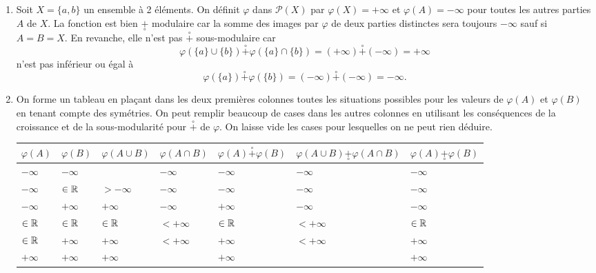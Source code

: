   \begin{demo}
  \begin{enumerate}
    \item Soit $X=\{a,b\}$ un ensemble à 2 éléments. On définit $\varphi$ dans $\mathcal{P}(X)$ par $\varphi(X) = +\infty$ et $\varphi(A) = - \infty$ pour toutes les autres parties $A$ de $X$. La fonction est bien $\underset{\circ}{+}$ modulaire car la somme des images par $\varphi$ de deux parties distinctes sera toujours $-\infty$ sauf si $A=B=X$. En revanche, elle n'est pas $\overset{\circ}{+}$ sous-modulaire car
    \begin{displaymath}
      \varphi(\{a\}\cup \{b\}) \overset{\circ}{+} \varphi(\{a\}\cap \{b\}) = (+\infty) \overset{\circ}{+} (-\infty) = + \infty
    \end{displaymath}
    n'est pas inférieur ou égal à
    \begin{displaymath}
      \varphi(\{a\}) \overset{\circ}{+} \varphi(\{b\}) = (-\infty) \overset{\circ}{+} (-\infty) = - \infty.
    \end{displaymath}

    \item On forme un tableau en plaçant dans les deux premières colonnes toutes les situations possibles pour les valeurs de $\varphi(A)$ et $\varphi(B)$ en tenant compte des symétries. On peut remplir beaucoup de cases dans  les autres colonnes en utilisant les conséquences de la croissance et de la sous-modularité pour $\overset{\circ}{+}$ de $\varphi$. On laisse vide les cases pour lesquelles on ne peut rien déduire.
\begin{center}
\begin{tabular}{lllllll}
$\varphi(A)$ & $\varphi(B)$ & $\varphi(A\cup B)$ & $\varphi(A\cap B)$ & $\varphi(A) \overset{\circ}{+} \varphi(B)$ & $\varphi(A\cup B) \underset{\circ}{+} \varphi(A\cap B)$ & $\varphi(A) \underset{\circ}{+} \varphi(B)$\\ \hline
$-\infty$    & $-\infty$    &                    & $-\infty$          & $-\infty$                              & $-\infty$   & $-\infty$ \\  \hline
$-\infty$    & $\in \mathbb{R}$     & $> -\infty$        & $-\infty$          & $-\infty$                              & $-\infty$   & $-\infty$ \\ \hline
$-\infty$    & $+\infty$    & $+\infty$          & $-\infty$          & $+\infty$                              & $-\infty$   & $-\infty$\\ \hline
$\in \mathbb{R}$     & $\in \mathbb{R}$     & $\in \mathbb{R}$           & $< +\infty$        & $\in \mathbb{R}$                               & $< +\infty$ & $\in \mathbb{R}$\\ \hline
$\in \mathbb{R}$     & $+\infty$    & $+\infty$          & $< +\infty$        & $+\infty$                              & $< +\infty$ & $+\infty$ \\ \hline
$+\infty$    & $+\infty$    & $+\infty$          &                    & $+\infty$                              &             & $+\infty$\\ \hline
\end{tabular}
\end{center}
  \end{enumerate}
  \end{demo}
